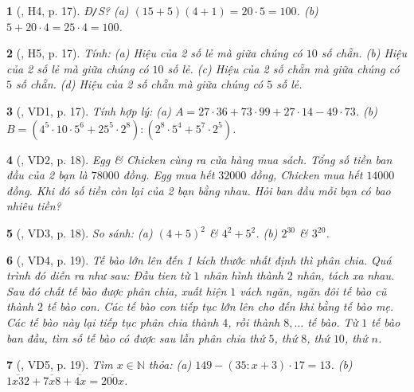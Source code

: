 \documentclass{article}
\newtheorem{baitoan}{}
\begin{document}
\begin{baitoan}[\cite{Binh_boi_duong_Toan_6_tap_1}, H4, p. 17]
	{\rm Đ{\tt/}S?} (a) $(15 + 5)(4 + 1) = 20\cdot5 = 100$. (b) $5 + 20\cdot4 = 25\cdot4 = 100$.
\end{baitoan}

\begin{baitoan}[\cite{Binh_boi_duong_Toan_6_tap_1}, H5, p. 17]
	Tính: (a) Hiệu của 2 số lẻ mà giữa chúng có $10$ số chẵn. (b) Hiệu của 2 số lẻ mà giữa chúng có $10$ số lẻ. (c) Hiệu của 2 số chẵn mà giữa chúng có $5$ số chẵn. (d) Hiệu của 2 số chẵn mà giữa chúng có $5$ số lẻ.
\end{baitoan}

\begin{baitoan}[\cite{Binh_boi_duong_Toan_6_tap_1}, VD1, p. 17]
	Tính hợp lý: (a) $A = 27\cdot36 + 73\cdot99 + 27\cdot14 - 49\cdot73$. (b) $B = (4^5\cdot10\cdot5^6 + 25^5\cdot2^8):(2^8\cdot5^4 + 5^7\cdot2^5)$.
\end{baitoan}

\begin{baitoan}[\cite{Binh_boi_duong_Toan_6_tap_1}, VD2, p. 18]
	Egg \& Chicken cùng ra cửa hàng mua sách. Tổng số tiền ban đầu của 2 bạn là $78000$ đồng. Egg mua hết $32000$ đồng, Chicken mua hết $14000$ đồng. Khi đó số tiền còn lại của 2 bạn bằng nhau. Hỏi ban đầu mỗi bạn có bao nhiêu tiền?
\end{baitoan}

\begin{baitoan}[\cite{Binh_boi_duong_Toan_6_tap_1}, VD3, p. 18]
	So sánh: (a) $(4 + 5)^2$ \& $4^2 + 5^2$. (b) $2^{30}$ \& $3^{20}$.
\end{baitoan}

\begin{baitoan}[\cite{Binh_boi_duong_Toan_6_tap_1}, VD4, p. 19]
	Tế bào lớn lên đến 1 kích thước nhất định thì phân chia. Quá trình đó diễn ra như sau: Đầu tien từ $1$ nhân hình thành $2$ nhân, tách xa nhau. Sau đó chất tế bào được phân chia, xuất hiện $1$ vách ngăn, ngăn đôi tế bào cũ thành $2$ tế bào con. Các tế bào con tiếp tục lớn lên cho đến khi bằng tế bào mẹ. Các tế bào này lại tiếp tục phân chia thành $4$, rồi thành $8,\ldots$ tế bào. Từ $1$ tế bào ban đầu, tìm số tế bào có được sau lần phân chia thứ $5$, thứ $8$, thứ $10$, thứ $n$.
\end{baitoan}

\begin{baitoan}[\cite{Binh_boi_duong_Toan_6_tap_1}, VD5, p. 19]
	Tìm $x\in\mathbb{N}$ thỏa: (a) $149 - (35:x + 3)\cdot17 = 13$. (b) $\overline{1x32} + \overline{7x8} + \overline{4x} = \overline{200x}$.
\end{baitoan}
\end{document}
